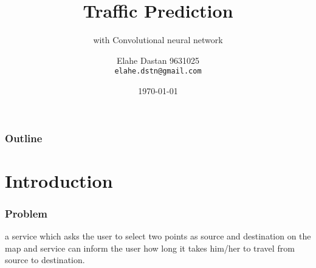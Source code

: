 \documentclass{beamer}
\author[elahe.dstn]{%
  Elahe Dastan\hfill
  9631025\\
  \texttt{elahe.dstn@gmail.com}
}
\title{Traffic Prediction}
\subtitle{with Convolutional neural network}
\institute{Machine Learning\\Amirkabir University of Technology}
\date{\minimaldate\today}
\begin{document}
\begin{frame}
  \titlepage{}
\end{frame}
\begin{frame}
  \frametitle{Outline}
  \tableofcontents{}
\end{frame}

\section{Introduction}

\begin{frame}
  \frametitle{Problem}
  \par
  a service which asks the user to select two points as source and destination on the map and
  service can inform the user how long it takes him/her to travel from source to destination.
\end{frame}
\end{document}
